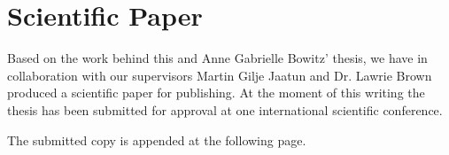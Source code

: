 \chapter{Scientific Paper}
\label{appendix:paper}
\acresetall

Based on the work behind this and Anne Gabrielle Bowitz' thesis, we have in
collaboration with our supervisors Martin Gilje Jaatun and Dr. Lawrie Brown
produced a scientific paper for publishing. At the moment of this writing the
thesis has been submitted for approval at one international scientific
conference.

The submitted copy is appended at the following page.

